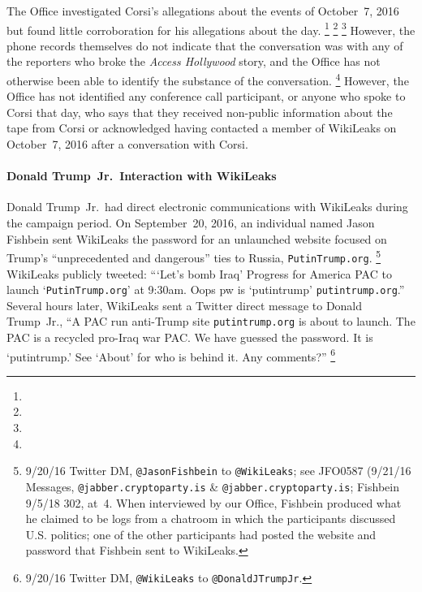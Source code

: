 The Office investigated Corsi's allegations about the events of October~7, 2016 but found little corroboration for his allegations about the day.%
\footnote{ }
\footnote{}
\footnote{  }
However, the phone records themselves do not indicate that the conversation was with any of the reporters who broke the \textit{Access Hollywood} story, and the Office has not otherwise been able to identify the substance of the conversation.
\footnote{    }
However, the Office has not identified any conference call participant, or anyone who spoke to Corsi that day, who says that they received non-public information about the tape from Corsi or acknowledged having contacted a member of WikiLeaks on October~7, 2016 after a conversation with Corsi.

\paragraph{Donald Trump~Jr.\ Interaction with WikiLeaks}

Donald Trump~Jr.\ had direct electronic communications with WikiLeaks during the campaign period.
On September~20, 2016, an individual named Jason Fishbein sent WikiLeaks the password for an unlaunched website focused on Trump's ``unprecedented and dangerous'' ties to Russia, \verb+PutinTrump.org+.%
\footnote{9/20/16 Twitter DM, \verb+@JasonFishbein+ to \verb+@WikiLeaks+;
see JFO0587 (9/21/16 Messages, \verb+@jabber.cryptoparty.is+ \& \verb+@jabber.cryptoparty.is+;
Fishbein 9/5/18 302, at~4.
When interviewed by our Office, Fishbein produced what he claimed to be logs from a chatroom in which the participants discussed U.S. politics;
one of the other participants had posted the website and password that Fishbein sent to WikiLeaks.}
WikiLeaks publicly tweeted: ``\thinspace`Let's bomb Iraq'
Progress for America PAC to launch `\verb+PutinTrump.org+' at 9:30am. Oops pw is `putintrump' \verb+putintrump.org+.''
Several hours later, WikiLeaks sent a Twitter direct message to Donald Trump~Jr., ``A PAC run anti-Trump site \verb+putintrump.org+ is about to launch.
The PAC is a recycled pro-Iraq war PAC\null.
We have guessed the password.
It is `putintrump.'
See `About' for who is behind it.
Any comments?''%
\footnote{9/20/16 Twitter DM, \verb+@WikiLeaks+ to \verb+@DonaldJTrumpJr+.}


